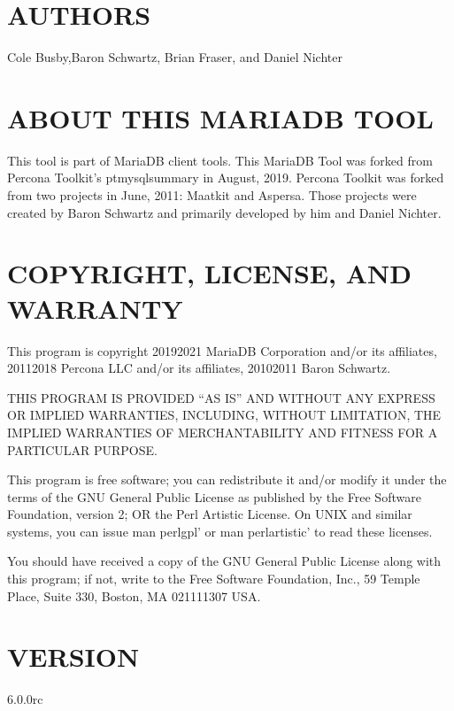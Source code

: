 \documentclass[letterpaper,10pt,english]{sphinxmanual}
\begin{document}
\section{AUTHORS}
\label{\detokenize{mariadb-database-summary:authors}}
Cole Busby,Baron Schwartz, Brian Fraser, and Daniel Nichter


\section{ABOUT THIS MARIADB TOOL}
\label{\detokenize{mariadb-database-summary:about-this-mariadb-tool}}
This tool is part of MariaDB client tools. This MariaDB Tool was forked from
Percona Toolkit’s pt\sphinxhyphen{}mysql\sphinxhyphen{}summary in August, 2019. Percona Toolkit was forked
from two projects in June, 2011: Maatkit and Aspersa.  Those projects were
created by Baron Schwartz and primarily developed by him and Daniel Nichter.


\section{COPYRIGHT, LICENSE, AND WARRANTY}
\label{\detokenize{mariadb-database-summary:copyright-license-and-warranty}}
This program is copyright 2019\sphinxhyphen{}2021 MariaDB Corporation and/or its affiliates,
2011\sphinxhyphen{}2018 Percona LLC and/or its affiliates, 2010\sphinxhyphen{}2011 Baron Schwartz.

THIS PROGRAM IS PROVIDED “AS IS” AND WITHOUT ANY EXPRESS OR IMPLIED
WARRANTIES, INCLUDING, WITHOUT LIMITATION, THE IMPLIED WARRANTIES OF
MERCHANTABILITY AND FITNESS FOR A PARTICULAR PURPOSE.

This program is free software; you can redistribute it and/or modify it under
the terms of the GNU General Public License as published by the Free Software
Foundation, version 2; OR the Perl Artistic License.  On UNIX and similar
systems, you can issue \textasciigrave{}man perlgpl’ or \textasciigrave{}man perlartistic’ to read these
licenses.

You should have received a copy of the GNU General Public License along with
this program; if not, write to the Free Software Foundation, Inc., 59 Temple
Place, Suite 330, Boston, MA  02111\sphinxhyphen{}1307  USA.


\section{VERSION}
\label{\detokenize{mariadb-database-summary:version}}
 6.0.0rc
\end{document}
